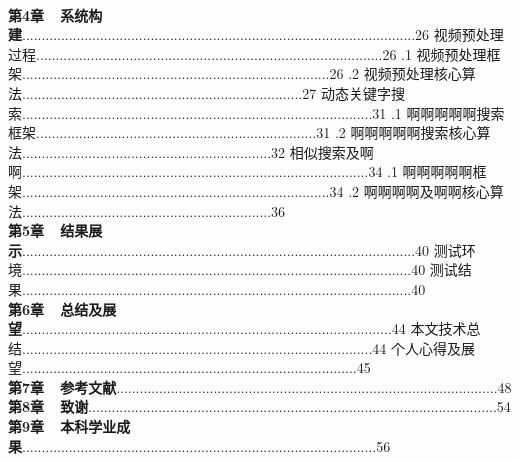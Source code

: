 \documentclass[a4paper,12pt,UTF8]{ctexart}
\begin{document}
\begin{spacing}{1.1}
\begin{spacing}{1.45}
\\\textbf{第4章\ \ 系统构建}.....................................................................................................26
 视频预处理过程.........................................................................................26
\indent{}.1 视频预处理框架...............................................................................26
\indent{}.2 视频预处理核心算法........................................................................27
 动态关键字搜索..........................................................................................31
\indent{}.1 啊啊啊啊啊搜索框架........................................................................31
\indent{}.2 啊啊啊啊啊搜索核心算法................................................................32
 相似搜索及啊啊.........................................................................................34
\indent{}.1 啊啊啊啊啊框架...............................................................................34
\indent{}.2 啊啊啊啊及啊啊核心算法................................................................36
\\\textbf{第5章\ \ 结果展示}.....................................................................................................40
 测试环境....................................................................................................40
 测试结果....................................................................................................40
\\\textbf{第6章\ \ 总结及展望}...............................................................................................44
 本文技术总结..........................................................................................44
 个人心得及展望......................................................................................45
\\\textbf{第7章\ \ 参考文献}..................................................................................................48
\\\textbf{第8章\ \ 致谢}.........................................................................................................54
\\\textbf{第9章\ \ 本科学业成果}...........................................................................................56
\end{spacing}





\end{spacing}
\end{document}
